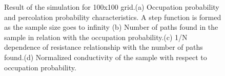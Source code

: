 \documentclass[11pt,a4paper]{report}
\begin{document}
\begin{figure}[!h]
\begin{minipage}{.5\linewidth}
\end{minipage}%
\begin{minipage}{.5\linewidth}
\centering
{}
\end{minipage}%

\caption{Result of the simulation for 100x100 grid.(a) Occupation probability and percolation probability characteristics. A step function is formed as the sample size goes to infinity (b) Number of paths found in the sample in relation with the occupation probability.(c) 1/N dependence of resistance relationship with the number of paths found.(d) Normalized conductivity of the sample with respect to occupation probability.}
\label{fig:percolation_sim}
\end{figure}
\end{document}
